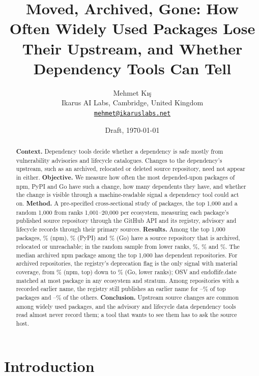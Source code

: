 \documentclass[11pt,a4paper]{article}
\title{Moved, Archived, Gone: How Often Widely Used Packages Lose Their
Upstream, and Whether Dependency Tools Can Tell}
\author{Mehmet Kış\\
Ikarus AI Labs, Cambridge, United Kingdom\\
\href{mailto:mehmet@ikaruslabs.net}{\texttt{mehmet@ikaruslabs.net}}}
\date{Draft, \today}
\begin{document}
\maketitle

\begin{abstract}
\noindent\textbf{Context.} Dependency tools decide whether a dependency
is safe mostly from vulnerability advisories and lifecycle catalogues.
Changes to the dependency's upstream, such as an archived, relocated or
deleted source repository, need not appear in either.
\textbf{Objective.} We measure how often the most depended-upon packages
of npm, PyPI and Go have such a change, how many dependents they have,
and whether the change is visible through a machine-readable signal a
dependency tool could act on.
\textbf{Method.} A pre-specified cross-sectional study of
 packages, the top 1,000 and a random 1,000 from ranks
1,001--20,000 per ecosystem, measuring each package's published source
repository through the GitHub API and its registry, advisory and
lifecycle records through their primary sources.
\textbf{Results.} Among the top 1,000 packages, \%
(npm), \% (PyPI) and \% (Go) have a
source repository that is archived, relocated or unreachable; in the
random sample from lower ranks, \%, \%
and \%. The median archived npm package among the top
1,000 has  dependent repositories. For archived
repositories, the registry's deprecation flag is the only signal with
material coverage, from \% (npm, top) down
to \% (Go, lower ranks); OSV and
endoflife.date matched at most  package in any
ecosystem and stratum. Among repositories with a recorded earlier name,
the registry still publishes an earlier name for
--\% of top packages and
--\% of the others.
\textbf{Conclusion.} Upstream source changes are common among widely
used packages, and the advisory and lifecycle data dependency tools read
almost never record them; a tool that wants to see them has to ask the
source host.
\end{abstract}

\section{Introduction}
\label{sec:intro}
\end{document}
